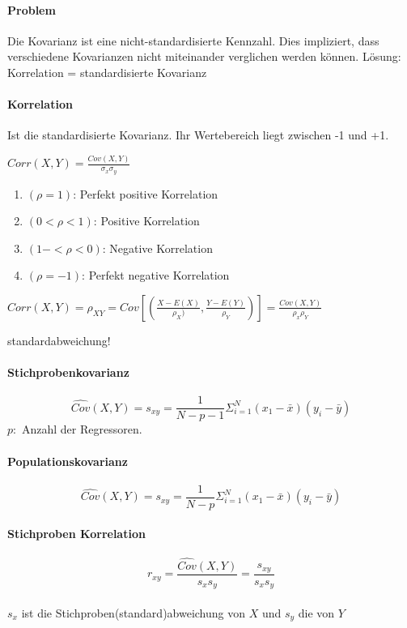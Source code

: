 \documentclass[a3paper, 8pt]{extarticle}
\begin{document}
\begin{multicols*}{5}
\paragraph{Problem} Die Kovarianz ist eine nicht-standardisierte Kennzahl. Dies impliziert, dass verschiedene Kovarianzen nicht miteinander verglichen werden können. Lösung: Korrelation = standardisierte Kovarianz

\paragraph{Korrelation} Ist die standardisierte Kovarianz. Ihr Wertebereich liegt zwischen -1 und +1.

$Corr(X,Y)=\frac{Cov(X,Y)}{\sigma_x \sigma_y}$
\begin{enumerate}
    \item[] $(\rho =1)$: Perfekt positive Korrelation
    \item[] $(0<\rho <1)$: Positive Korrelation
    \item[] $(1- < \rho < 0)$: Negative Korrelation
    \item[] $(\rho =-1)$: Perfekt negative Korrelation
\end{enumerate}
\vspace{3pt}
$Corr(X,Y)=\rho_{XY} = Cov [(\frac{X-E(X)}{\rho_X)},\frac{Y-E(Y)}{\rho_Y})]=\frac{Cov(X,Y)}{\rho_x \rho_Y}$

standardabweichung!

\paragraph{Stichprobenkovarianz}
$$\widehat{Cov}(X,Y) = s_{xy} = \frac{1}{N-p-1} \Sigma_{i=1}^N (x_1- \bar{x})(y_i - \bar{y})$$
$p:$ Anzahl der Regressoren. 
\paragraph{Populationskovarianz}
$$\widehat{Cov}(X,Y) = s_{xy} = \frac{1}{N-p} \Sigma_{i=1}^N (x_1- \bar{x})(y_i - \bar{y})$$

\paragraph{Stichproben Korrelation}
$$r_{xy}=\frac{\widehat{Cov}(X,Y)}{s_x s_y}=\frac{s_{xy}}{s_x s_y}$$\\
$s_x$ ist die Stichproben(standard)abweichung von $X$ und $s_y$ die von $Y$




\end{multicols*}
\end{document}
